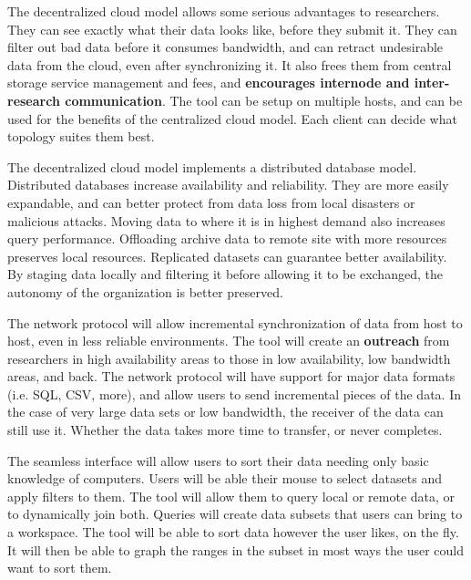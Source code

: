 The decentralized cloud model allows some serious advantages to researchers.
They can see exactly what their data looks like, before they submit it.
They can filter out bad data before it consumes bandwidth, and can retract
undesirable data from the cloud, even after synchronizing it. It also frees
them from central storage service management and fees, and 
\textbf{encourages internode and inter-research communication}. 
The tool can be setup
on multiple hosts, and can be used for the benefits of 
the centralized cloud model. Each client can decide what topology suites them 
best.

The decentralized cloud model implements a distributed database model.
Distributed databases increase availability and reliability. They are more
easily expandable, and can better protect from data loss from local disasters or
malicious attacks. Moving data to where it is in highest demand also increases
query performance. Offloading archive data to remote site with more 
resources preserves local resources. Replicated datasets can guarantee 
better availability. By staging data locally and filtering it before allowing
it to be exchanged, the autonomy of the organization is better preserved. 

The network protocol will allow incremental synchronization of data from host
to host, even in less reliable environments. The tool will create
an \textbf{outreach} from researchers in high availability areas to those
in low availability, low bandwidth areas, and back. The network protocol
will have support for major data formats (i.e. SQL, CSV, more), and allow
users to send incremental pieces of the data. In the case of very large 
data sets or low bandwidth, the receiver of the data can still use it. Whether 
the data takes more time to transfer, or never completes.

The seamless interface will allow users to sort their data needing only 
basic knowledge of computers. Users will be able their mouse to select
datasets and apply filters to them. The tool will allow them to query local or
remote data, or to dynamically join both. Queries will create data subsets that
users can bring to a workspace. The tool will be able to sort data however
the user likes, on the fly. It will then be able to graph the ranges in 
the subset in most ways the user could want to sort them.

